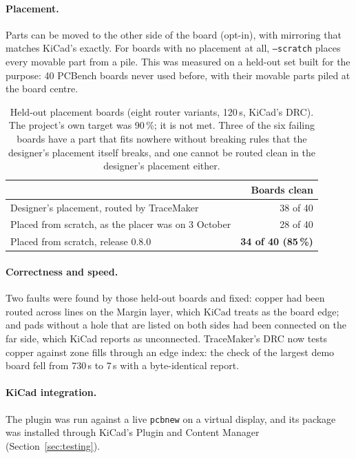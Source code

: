 \documentclass[10pt,a4paper]{article}
\begin{document}
\paragraph{Placement.} Parts can be moved to the other side of the board (opt-in), with mirroring that matches
KiCad's exactly. For boards with no placement at all, \texttt{--scratch} places every movable part from a pile.
This was measured on a held-out set built for the purpose: 40 PCBench boards never used before, with their
movable parts piled at the board centre.

\begin{table}[h]
\centering
\small
\begin{tabular}{lr}
\toprule
& Boards clean \\
\midrule
Designer's placement, routed by TraceMaker & 38 of 40 \\
Placed from scratch, as the placer was on 3 October & 28 of 40 \\
Placed from scratch, release 0.8.0 & \textbf{34 of 40 (85\,\%)} \\
\bottomrule
\end{tabular}
\caption{Held-out placement boards (eight router variants, 120\,s, KiCad's DRC). The project's own target was
90\,\%; it is not met. Three of the six failing boards have a part that fits nowhere without breaking rules that
the designer's placement itself breaks, and one cannot be routed clean in the designer's placement either.}
\label{tab:scratch}
\end{table}

\paragraph{Correctness and speed.} Two faults were found by those held-out boards and fixed: copper had been routed
across lines on the Margin layer, which KiCad treats as the board edge; and pads without a hole that are listed on
both sides had been connected on the far side, which KiCad reports as unconnected. TraceMaker's DRC now tests
copper against zone fills through an edge index: the check of the largest demo board fell from 730\,s to 7\,s with
a byte-identical report.

\paragraph{KiCad integration.} The plugin was run against a live \texttt{pcbnew} on a virtual display, and its
package was installed through KiCad's Plugin and Content Manager (Section~\ref{sec:testing}).
\end{document}
